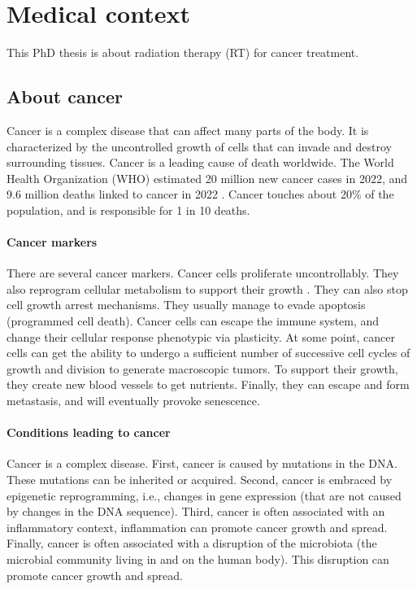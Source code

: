 \section{Medical context}

This PhD thesis is about radiation therapy (RT) for cancer treatment.

\subsection{About cancer}

Cancer is a complex disease that can affect many parts of the body.
It is characterized by the uncontrolled growth of cells that can invade and destroy surrounding tissues.
Cancer is a leading cause of death worldwide.
The World Health Organization (WHO) estimated 20 million new cancer cases in 2022, and 9.6 million deaths linked to cancer in 2022 \cite{who_cancer2022}.
Cancer touches about 20\% of the population, and is responsible for 1 in 10 deaths.

\paragraph{Cancer markers}
There are several cancer markers.
Cancer cells proliferate uncontrollably.
They also reprogram cellular metabolism to support their growth \cite{Chammas2013}.
They can also stop cell growth arrest mechanisms.
They usually manage to evade apoptosis (programmed cell death).
Cancer cells can escape the immune system, and change their cellular response phenotypic via plasticity.
At some point, cancer cells can get the ability to undergo a sufficient number of successive cell cycles of growth and division to generate macroscopic tumors.
To support their growth, they create new blood vessels to get nutrients.
Finally, they can escape and form metastasis, and will eventually provoke senescence.

\paragraph{Conditions leading to cancer}
Cancer is a complex disease.
First, cancer is caused by mutations in the DNA.
These mutations can be inherited or acquired.
Second, cancer is embraced by epigenetic reprogramming, i.e., changes in gene expression (that are not caused by changes in the DNA sequence).
Third, cancer is often associated with an inflammatory context, inflammation can promote cancer growth and spread.
Finally, cancer is often associated with a disruption of the microbiota (the microbial community living in and on the human body).
This disruption can promote cancer growth and spread.


